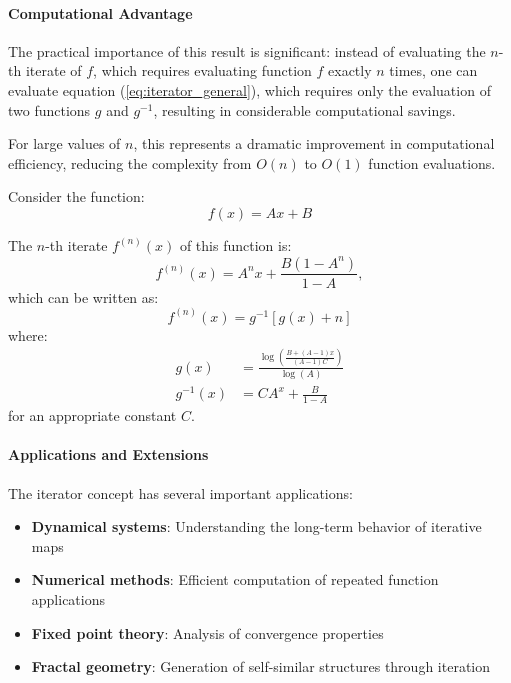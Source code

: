 \paragraph{Computational Advantage}
The practical importance of this result is significant: instead of evaluating the $n$-th iterate of $f$, which requires evaluating function $f$ exactly $n$ times, one can evaluate equation (\ref{eq:iterator_general}), which requires only the evaluation of two functions $g$ and $g^{-1}$, resulting in considerable computational savings.

For large values of $n$, this represents a dramatic improvement in computational efficiency, reducing the complexity from $O(n)$ to $O(1)$ function evaluations.
\begin{example}
Consider the function:
\begin{equation}
f(x) = Ax + B
\end{equation}

The $n$-th iterate $f^{(n)}(x)$ of this function is:
\begin{equation}
f^{(n)}(x) = A^n x + \frac{B(1-A^n)}{1-A},
\end{equation}
which can be written as:
\begin{equation}
f^{(n)}(x) = g^{-1}[g(x) + n]
\end{equation}
where:
\begin{align}
g(x) &= \frac{\log\left(\frac{B+(A-1)x}{(A-1)C}\right)}{\log(A)} \\
g^{-1}(x) &= CA^x + \frac{B}{1-A}
\end{align}
for an appropriate constant $C$.
\end{example}

\paragraph{Applications and Extensions}
The iterator concept has several important applications:
\begin{itemize}
\item \textbf{Dynamical systems}: Understanding the long-term behavior of iterative maps
\item \textbf{Numerical methods}: Efficient computation of repeated function applications
\item \textbf{Fixed point theory}: Analysis of convergence properties
\item \textbf{Fractal geometry}: Generation of self-similar structures through iteration
\end{itemize}

